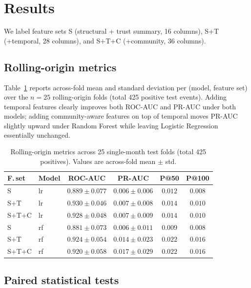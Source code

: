 \section{Results}\label{sec:results}

We label feature sets S (structural + trust summary, 16 columns),
S$+$T (+temporal, 28 columns), and S$+$T$+$C (+community, 36 columns).

\subsection{Rolling-origin metrics}\label{sec:results:rolling}

Table~\ref{tab:rolling_summary} reports across-fold mean and standard
deviation per (model, feature set) over the $n = 25$ rolling-origin
folds (total 425 positive test events). Adding temporal features
clearly improves both ROC-AUC and PR-AUC under both models; adding
community-aware features on top of temporal moves PR-AUC slightly
upward under Random Forest while leaving Logistic Regression
essentially unchanged.

\begin{table}[t]
\caption{Rolling-origin metrics across 25 single-month test folds
(total 425 positives). Values are across-fold mean $\pm$ std.}
\label{tab:rolling_summary}
\centering
\small
\begin{tabular}{llcccc}
\toprule
F.\,set & Model & ROC-AUC & PR-AUC & P@50 & P@100 \\
\midrule
S       & lr & $0.889 \pm 0.077$ & $0.006 \pm 0.006$ & $0.012$ & $0.008$ \\
S$+$T   & lr & $0.930 \pm 0.046$ & $0.007 \pm 0.008$ & $0.014$ & $0.010$ \\
S$+$T$+$C & lr & $0.928 \pm 0.048$ & $0.007 \pm 0.009$ & $0.014$ & $0.010$ \\
\addlinespace
S       & rf & $0.881 \pm 0.073$ & $0.006 \pm 0.011$ & $0.009$ & $0.008$ \\
S$+$T   & rf & $0.924 \pm 0.054$ & $0.014 \pm 0.023$ & $0.022$ & $0.016$ \\
S$+$T$+$C & rf & $0.920 \pm 0.058$ & $0.017 \pm 0.029$ & $0.022$ & $0.016$ \\
\bottomrule
\end{tabular}
\end{table}

\subsection{Paired statistical tests}\label{sec:results:tests}

